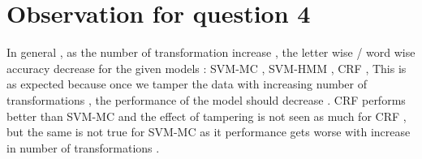 \documentclass[11pt]{report}
\begin{document}
\section*{Observation for question 4}
In general , as the number of transformation increase , the letter wise / word wise accuracy decrease for the given models : SVM-MC , SVM-HMM , CRF ,
This is as expected because once we tamper the data with increasing number of transformations , the performance of the model should decrease .
CRF performs better than SVM-MC and the effect of tampering is not seen as much for CRF , but the same is not true for SVM-MC as 
it performance gets worse with increase in number of transformations .
\end{document}
